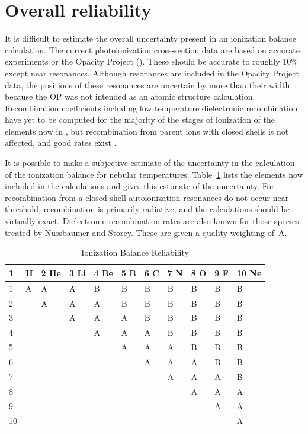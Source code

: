 \section{Overall reliability}

It is difficult to estimate the overall uncertainty present in an
ionization balance calculation.  The current photoionization cross-section
data are based on accurate experiments or the Opacity Project (\citealp{VernerFerlandKorista1996}).  These should be accurate to roughly 10\% except near resonances.
Although resonances are included in the Opacity Project data, the positions
of these resonances are uncertain by more than their width because the OP
was not intended as an atomic structure calculation.  Recombination
coefficients including low temperature dielectronic recombination have yet
to be computed for the majority of the stages of ionization of the elements
now in \Cloudy, but recombination from parent ions with closed shells is
not affected, and good rates exist \citep{VernerFerland1996}.

It is possible to make a subjective estimate of the uncertainty in the
calculation of the ionization balance for nebular temperatures.
Table~\ref{tab:IonizationBalanceReliability}
lists the elements now included in the calculations and gives this estimate
of the uncertainty.  For recombination from a closed shell autoionization
resonances do not occur near threshold, recombination is primarily radiative,
and the calculations should be virtually exact.  Dielectronic recombination
rates are also known for those species treated by
Nussbaumer and Storey.
These are given a quality weighting of~A.

\begin{table}
\begin{center}
\caption{Ionization Balance Reliability}
\label{tab:IonizationBalanceReliability}
\begin{tabular}{lllllllllll}
\hline
1& H&2 He&3 Li&4 Be&5 B&6 C&7 N&8 O&9 F&10 Ne\\
\hline
1&A&A&A&B&B&B&B&B&B&B\\
2&& A&A&A&B&B&B&B&B&B\\
3&&&A&A&A&B&B&B&B&B\\
4&&&&A&A&A&B&B&B&B\\
5&&&&&A&A&A&B&B&B\\
6&&&&&&A&A&A&B&B\\
7&&&&&&&A&A&A&B\\
8&&&&&&&&A&A&A\\
9&&&&&&&&&A&A\\
10&&&&&&&&&&A\\
\hline
\end{tabular}
\end{center}
\end{table}


